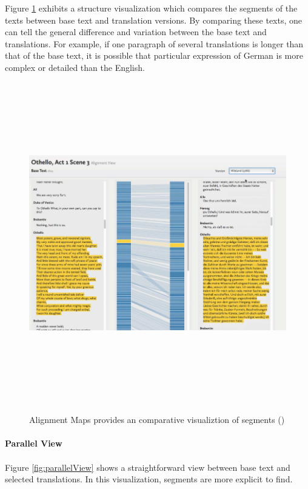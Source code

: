 Figure \ref{fig:alignmentMap} exhibits a structure visualization which compares the segments of the texts between base text and translation versions. By comparing these texts, one can tell the general difference and variation between the base text and translations. For example, if one paragraph of several translations is longer than that of the base text, it is possible that particular expression of German is more complex or detailed than the English. 

\begin{figure}[H] 
	\centering	
	\includegraphics[width=16cm, height=14cm]{Figs/Alignment-Map}\\[1ex]
	\caption{Alignment Maps provides an comparative visualiztion of segments (\cite{Cheesman2012})}
	\label{fig:alignmentMap}
\end{figure} 

\paragraph{Parallel View}
\paragraph[]{}

Figure \ref{fig:parallelView} shows a straightforward view between base text and selected translations. In this visualization, segments are more explicit to find.

